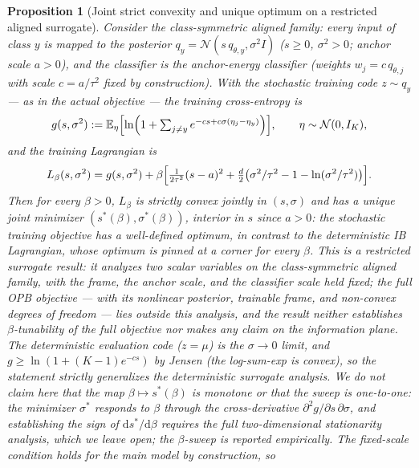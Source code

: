 \documentclass{article}
\theoremstyle{plain}
\newtheorem{proposition}{Proposition}[section]
\theoremstyle{remark}
\newcommand{\E}{\mathbb{E}}
\begin{document}
\begin{proposition}[Joint strict convexity and unique optimum on a restricted aligned surrogate]
\label{prop:opb-sweep}
Consider the class-symmetric aligned family: every input of class $y$ is mapped to the
posterior $q_y = \mathcal{N}(s\,q_{\theta,y}, \sigma^2 I)$ ($s \ge 0$, $\sigma^2 > 0$;
anchor scale $a > 0$), and the classifier is the anchor-energy classifier (weights
$w_j = c\,q_{\theta,j}$ with scale $c = a/\tau^2$ fixed by construction). With the
\emph{stochastic training code} $z \sim q_y$ --- as in the actual objective --- the
training cross-entropy is
\begin{equation}
g(s, \sigma^2) := \E_\eta\Bigl[
\ln\Bigl(1 + \textstyle\sum_{j \ne y} e^{-cs + c\sigma(\eta_j - \eta_y)}\Bigr)
\Bigr],
\qquad \eta \sim \mathcal{N}(0, I_K),
\end{equation}
and the training Lagrangian is
\begin{equation}
L_\beta(s, \sigma^2) = g(s, \sigma^2)
+ \beta\Bigl[
\tfrac{1}{2\tau^2}(s-a)^2
+ \tfrac{d}{2}\bigl(\sigma^2/\tau^2 - 1 - \ln(\sigma^2/\tau^2)\bigr)
\Bigr].
\end{equation}
Then for every $\beta > 0$, $L_\beta$ is strictly convex jointly in $(s, \sigma)$ and
has a unique joint minimizer $(s^*(\beta), \sigma^*(\beta))$, interior in $s$ since
$a > 0$: the stochastic training objective has a well-defined optimum, in contrast to
the deterministic IB Lagrangian, whose optimum is pinned at a corner for every $\beta$.
This is a \emph{restricted surrogate result}: it analyzes two scalar variables on the
class-symmetric aligned family, with the frame, the anchor scale, and the classifier
scale held fixed; the full OPB objective --- with its nonlinear posterior, trainable
frame, and non-convex degrees of freedom --- lies outside this analysis, and the
result neither establishes $\beta$-tunability of the full objective nor makes any
claim on the information plane. The deterministic evaluation code ($z = \mu$) is the
$\sigma \to 0$ limit, and $g \ge \ln(1 + (K-1)e^{-cs})$ by Jensen (the log-sum-exp is
convex), so the statement strictly generalizes the deterministic surrogate analysis.
We do \emph{not} claim here that the map $\beta \mapsto s^*(\beta)$ is monotone or
that the sweep is one-to-one: the minimizer $\sigma^*$ responds to $\beta$ through
the cross-derivative $\partial^2 g/\partial s\,\partial\sigma$, and establishing the
sign of $\mathrm{d}s^*/\mathrm{d}\beta$ requires the full two-dimensional
stationarity analysis, which we leave open; the $\beta$-sweep is reported
empirically. The fixed-scale condition holds for the main model by construction, so

\end{proposition}
\end{document}
